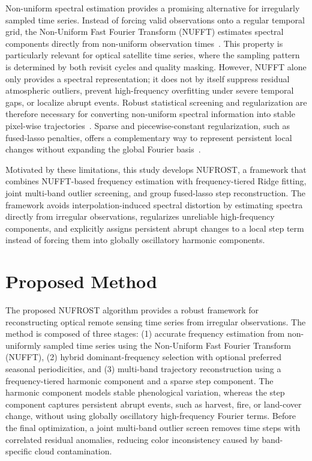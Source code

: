 \documentclass[letterpaper,journal]{IEEEtran}
\begin{document}
Non-uniform spectral estimation provides a promising alternative for irregularly sampled time series. Instead of forcing valid observations onto a regular temporal grid, the Non-Uniform Fast Fourier Transform (NUFFT) estimates spectral components directly from non-uniform observation times~\cite{ref4,ref6}. This property is particularly relevant for optical satellite time series, where the sampling pattern is determined by both revisit cycles and quality masking. However, NUFFT alone only provides a spectral representation; it does not by itself suppress residual atmospheric outliers, prevent high-frequency overfitting under severe temporal gaps, or localize abrupt events. Robust statistical screening and regularization are therefore necessary for converting non-uniform spectral information into stable pixel-wise trajectories~\cite{ref8,ref9}. Sparse and piecewise-constant regularization, such as fused-lasso penalties, offers a complementary way to represent persistent local changes without expanding the global Fourier basis~\cite{ref15}.

Motivated by these limitations, this study develops NUFROST, a framework that combines NUFFT-based frequency estimation with frequency-tiered Ridge fitting, joint multi-band outlier screening, and group fused-lasso step reconstruction. The framework avoids interpolation-induced spectral distortion by estimating spectra directly from irregular observations, regularizes unreliable high-frequency components, and explicitly assigns persistent abrupt changes to a local step term instead of forcing them into globally oscillatory harmonic components.

\section{Proposed Method}
The proposed NUFROST algorithm provides a robust framework for reconstructing optical remote sensing time series from irregular observations. The method is composed of three stages: (1) accurate frequency estimation from non-uniformly sampled time series using the Non-Uniform Fast Fourier Transform (NUFFT), (2) hybrid dominant-frequency selection with optional preferred seasonal periodicities, and (3) multi-band trajectory reconstruction using a frequency-tiered harmonic component and a sparse step component. The harmonic component models stable phenological variation, whereas the step component captures persistent abrupt events, such as harvest, fire, or land-cover change, without using globally oscillatory high-frequency Fourier terms. Before the final optimization, a joint multi-band outlier screen removes time steps with correlated residual anomalies, reducing color inconsistency caused by band-specific cloud contamination.
\end{document}
